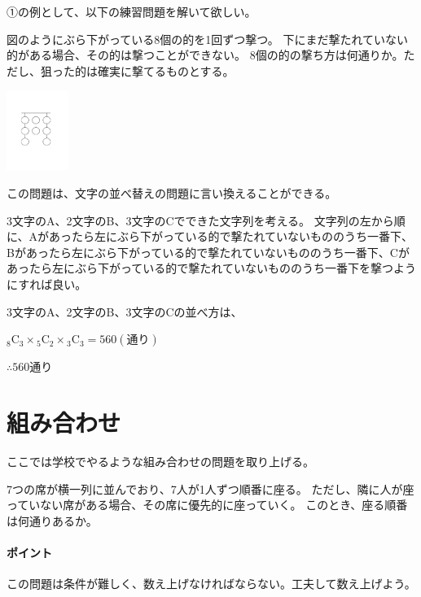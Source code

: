 \documentclass[uplatex,dvipdfmx]{jsbook}
\begin{document}
①の例として、以下の練習問題を解いて欲しい。

\begin{problem}[練習問題]
    図のようにぶら下がっている8個の的を1回ずつ撃つ。
    下にまだ撃たれていない的がある場合、その的は撃つことができない。
    8個の的の撃ち方は何通りか。ただし、狙った的は確実に撃てるものとする。

    \includegraphics[clip,width=2cm]{figures/c_practice1.pdf}
\end{problem}

\begin{answer}
    この問題は、文字の並べ替えの問題に言い換えることができる。

    3文字のA、2文字のB、3文字のCでできた文字列を考える。
    文字列の左から順に、Aがあったら左にぶら下がっている的で撃たれていないもののうち一番下、Bがあったら左にぶら下がっている的で撃たれていないもののうち一番下、Cがあったら左にぶら下がっている的で撃たれていないもののうち一番下を撃つようにすれば良い。

    3文字のA、2文字のB、3文字のCの並べ方は、

    ${}_8\mathrm{C}_3 \times {}_5\mathrm{C}_2 \times {}_3\mathrm{C}_3
    =560(\text{通り})$

    $\therefore 560$通り
\end{answer}

\section{組み合わせ}
ここでは学校でやるような組み合わせの問題を取り上げる。
\begin{problem}[練習問題1]
    7つの席が横一列に並んでおり、7人が1人ずつ順番に座る。
    ただし、隣に人が座っていない席がある場合、その席に優先的に座っていく。
    このとき、座る順番は何通りあるか。
\end{problem}
\paragraph{ポイント}この問題は条件が難しく、数え上げなければならない。工夫して数え上げよう。
\end{document}
